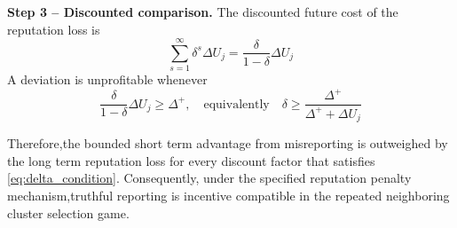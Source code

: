 \documentclass[journal]{IEEEtran}
\begin{document}
\begin{IEEEproof}
\begin{IEEEproof}
\smallskip
\noindent\textbf{Step 3 -- Discounted comparison.}
The discounted future cost of the reputation loss is
\begin{equation}
  \sum_{s=1}^{\infty}\delta^{s}\Delta U_{j}
  =\frac{\delta}{1-\delta}\Delta U_{j}
  \label{eq:future_penalty}
\end{equation}
A deviation is unprofitable whenever
\begin{equation}
  \frac{\delta}{1-\delta}\Delta U_{j}\geq\Delta^{+},
  \quad\text{equivalently}\quad
  \delta\geq\frac{\Delta^{+}}{\Delta^{+}+\Delta U_{j}}
  \label{eq:delta_condition}
\end{equation}

Therefore,the bounded short term advantage from misreporting is outweighed by the long term reputation loss for every discount factor that satisfies \eqref{eq:delta_condition}. Consequently, under the specified reputation penalty mechanism,truthful reporting is incentive compatible in the repeated neighboring cluster selection game.


\end{IEEEproof}
\end{IEEEproof}
\end{document}
